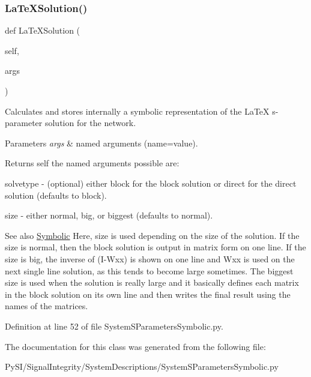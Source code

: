 \subsubsection{\texorpdfstring{La\+Te\+X\+Solution()}{LaTeXSolution()}}
{\footnotesize\ttfamily def La\+Te\+X\+Solution (\begin{DoxyParamCaption}\item[{}]{self,  }\item[{}]{args }\end{DoxyParamCaption})}



Calculates and stores internally a symbolic representation of the La\+TeX s-\/parameter solution for the network. 


\begin{DoxyParams}{Parameters}
{\em args} & named arguments (name=value). \\
\hline
\end{DoxyParams}
\begin{DoxyReturn}{Returns}
self the named arguments possible are\+:
\begin{DoxyItemize}
\item \textquotesingle{}solvetype\textquotesingle{} -\/ (optional) either \textquotesingle{}block\textquotesingle{} for the block solution or \textquotesingle{}direct\textquotesingle{} for the direct solution (defaults to \textquotesingle{}block\textquotesingle{}).
\item \textquotesingle{}size\textquotesingle{} -\/ either \textquotesingle{}normal\textquotesingle{}, \textquotesingle{}big\textquotesingle{}, or \textquotesingle{}biggest\textquotesingle{} (defaults to \textquotesingle{}normal\textquotesingle{}). 
\end{DoxyItemize}
\end{DoxyReturn}
\begin{DoxySeeAlso}{See also}
\hyperlink{namespaceSignalIntegrity_1_1SystemDescriptions_1_1Symbolic}{Symbolic} Here, \textquotesingle{}size\textquotesingle{} is used depending on the size of the solution. If the size is normal, then the block solution is output in matrix form on one line. If the size is big, the inverse of (I-\/\+Wxx) is shown on one line and Wxx is used on the next single line solution, as this tends to become large sometimes. The biggest size is used when the solution is really large and it basically defines each matrix in the block solution on its own line and then writes the final result using the names of the matrices. 
\end{DoxySeeAlso}


Definition at line 52 of file System\+S\+Parameters\+Symbolic.\+py.



The documentation for this class was generated from the following file\+:\begin{DoxyCompactItemize}
\item 
Py\+S\+I/\+Signal\+Integrity/\+System\+Descriptions/System\+S\+Parameters\+Symbolic.\+py\end{DoxyCompactItemize}

